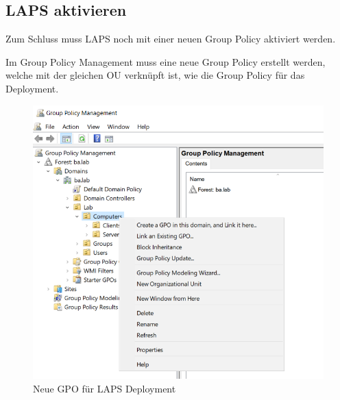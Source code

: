 \subsection{LAPS aktivieren}
Zum Schluss muss LAPS noch mit einer neuen Group Policy aktiviert werden.

Im Group Policy Management muss eine neue Group Policy erstellt werden, welche mit der gleichen OU verknüpft ist, wie die Group Policy für das Deployment.
\begin{figure}[H]
    \centering
    \includegraphics[width=0.7\linewidth]{../img/LAPS/GPO-Create-New.png}
    \caption{Neue GPO für LAPS Deployment}
\end{figure}
%
%
%
%